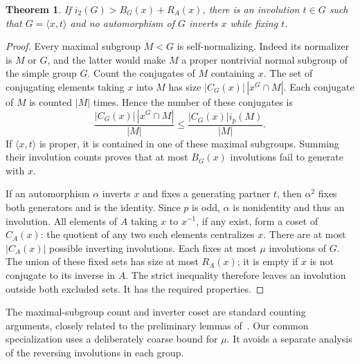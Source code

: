 \documentclass[11pt,a4paper]{article}
\newtheorem{theorem}{Theorem}
\newcommand{\ii}{i_2}
\begin{document}
\begin{theorem}\label{count}
If $\ii(G)>B_G(x)+R_A(x)$, there is an involution $t\in G$ such that
$G=\langle x,t\rangle$ and no automorphism of $G$ inverts $x$ while
fixing $t$.
\end{theorem}
\begin{proof}
Every maximal subgroup $M<G$ is self-normalizing. Indeed its normalizer
is $M$ or $G$, and the latter would make $M$ a proper nontrivial normal
subgroup of the simple group $G$. Count the conjugates of $M$ containing
$x$. The set of conjugating elements taking $x$ into $M$ has size
$|C_G(x)|\,|x^G\cap M|$. Each conjugate of $M$ is counted $|M|$
times. Hence the number of these conjugates is
\[
 \frac{|C_G(x)|\,|x^G\cap M|}{|M|}
       \le \frac{|C_G(x)|i_p(M)}{|M|}.
\]
If $\langle x,t\rangle$ is proper, it is contained in one of these
maximal subgroups. Summing their involution counts proves that at most
$B_G(x)$ involutions fail to generate with $x$.

If an automorphism $\alpha$ inverts $x$ and fixes a generating partner
$t$, then $\alpha^2$ fixes both generators and is the identity. Since
$p$ is odd, $\alpha$ is nonidentity and thus an involution. All elements
of $A$ taking $x$ to $x^{-1}$, if any exist, form a coset of $C_A(x)$:
the quotient of any two such elements centralizes $x$. There are at
most $|C_A(x)|$ possible inverting involutions. Each fixes at most
$\mu$ involutions of $G$. The union of these fixed sets has size at
most $R_A(x)$; it is empty if $x$ is not conjugate to its inverse in $A$.
The strict inequality therefore leaves an involution outside both
excluded sets. It has the required properties.
\end{proof}

The maximal-subgroup count and inverter coset are standard counting
arguments, closely related to the preliminary lemmas of~\cite{LL}.
Our common specialization uses a deliberately coarse bound for $\mu$.
It avoids a separate analysis of the reversing involutions in each group.
\end{document}
